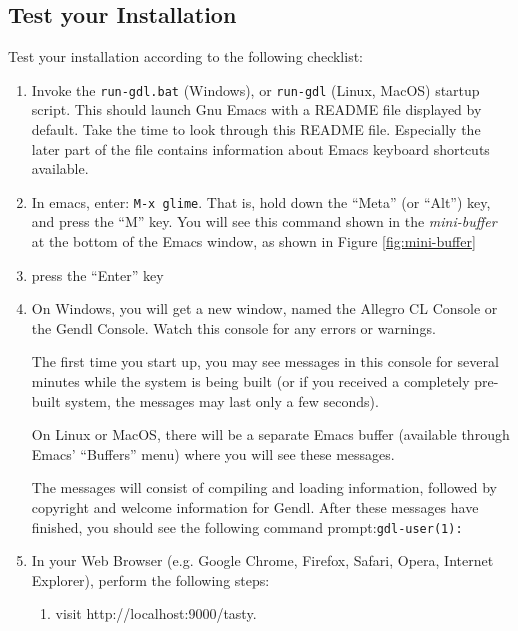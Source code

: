 \documentclass [11pt]{book}
\begin{document}
\subsection{Test your Installation}

\label{subsec:testyourinstallation}

Test your installation according to the following checklist:

\begin{enumerate}

\item Invoke the \texttt{run-gdl.bat} (Windows), or \texttt{run-gdl} (Linux, MacOS) startup script. This should launch Gnu Emacs with a 
README file displayed by default. Take the time to look through this README file. 
Especially the later part of the file contains information about Emacs keyboard
shortcuts available.

\item In emacs, enter: \texttt{M-x glime}. That is, hold down the ``Meta'' (or ``Alt'') key, and press the ``M'' key. 
You will see this command shown in the \emph{mini-buffer} at the bottom of the Emacs window, as shown in Figure 
\ref{fig:mini-buffer}

\item press the ``Enter'' key

\item On Windows, you will get a new window, named the Allegro CL Console or the Gendl Console. 
Watch this console for any errors or warnings. 

The first time you start up, you may see messages in this console for
several minutes while the system is being built (or if you received a
completely pre-built system, the messages may last only a few
seconds).

On Linux or MacOS, there will be a separate Emacs buffer (available
through Emacs' ``Buffers'' menu) where you will see these messages.

The messages will consist of compiling and loading information, followed by copyright and welcome information
for Gendl. After these messages have finished, you should see the following command prompt:\texttt{gdl-user(1): }

\item In your Web Browser (e.g. Google Chrome, Firefox, Safari, Opera, Internet Explorer), 
perform the following steps:

\begin{enumerate}

\item visit http://localhost:9000/tasty.


\end{enumerate}
\end{enumerate}
\end{document}
